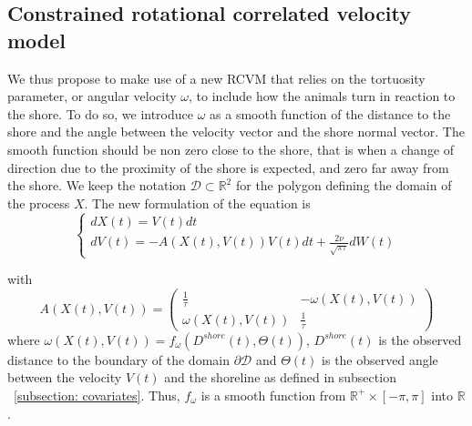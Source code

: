 \documentclass[11pt]{article}
\newcommand {\R}{\mathbb{R}}
\newcommand {\1}{\mathbb{1}}
\theoremstyle{definition}
\theoremstyle{remark}
\theoremstyle{remark}
\begin{document}
\subsection{Constrained rotational correlated velocity model}
\label{section: CRCVM}

We thus propose to make use of a new RCVM that relies on the tortuosity parameter, or angular velocity $\omega$, to include how the animals turn in reaction to the shore. 
To do so, we introduce $\omega$ as a smooth function of the distance to the shore and the angle between the velocity vector and the shore normal vector. 
The smooth function should be non zero close to the shore, that is when a change of direction due to the proximity of the shore is expected, and  zero far away from the shore. 
We keep the notation $\mathcal{D} \subset \R^2$ for the polygon defining the domain of the process $X$. The new formulation of the equation is 
\begin{equation} \left\{
	\begin{array}{l}
		dX(t)=V(t) dt \\
		dV(t)=-A(X(t),V(t))V(t)dt+\frac{2\nu}{\sqrt{\pi \tau}} dW(t) 
		
	\end{array}
	\right.
	\label{eq: CRCVM equation}
\end{equation}

with 
\begin{equation} 
		A(X(t),V(t))=\begin{pmatrix} 
			\frac{1}{\tau} & -\omega(X(t),V(t)) \\
			\omega(X(t),V(t)) & \frac{1}{\tau}
		\end{pmatrix}
	\label{eq: CRCVM matrix A}
\end{equation}
where $\omega(X(t),V(t))=f_{\omega}(D^{shore}(t),\Theta(t))$, $D^{shore}(t)$ is the observed distance to the boundary of the domain $\partial \mathcal{D}$
and $\Theta(t)$ is the observed angle between the velocity $V(t)$ and the shoreline as defined in subsection ~\ref{subsection: covariates}. Thus, $f_{\omega}$ is a smooth function from $\R^{+} \times [-\pi,\pi]$ into $\R$.
\end{document}
